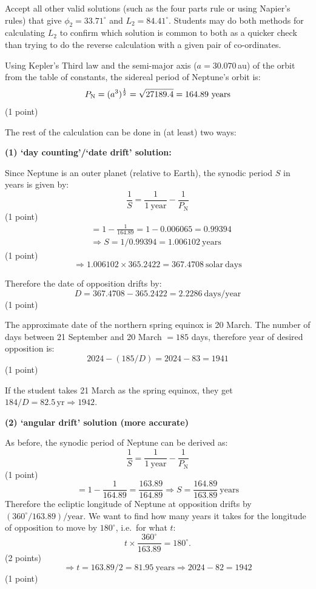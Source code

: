 Accept all other valid solutions (such as the four parts rule or using
Napier's rules) that give $\phi_2 = 33.71^\circ$ and $L_2 = 84.41^\circ$.
Students may do both methods for calculating $L_2$ to confirm which solution
is common to both as a quicker check than trying to do the reverse calculation
with a given pair of co-ordinates.

Using Kepler's Third law and the semi-major axis ($a = 30.070$\,au) of the
orbit from the table of constants, the sidereal period of Neptune's orbit is:
\[
  P_{\mathrm{N}} = (a^3)^{\frac{1}{2}} = \sqrt{27189.4}
    = 164.89\ \mathrm{years} \hfill
\]
\hfill(1 point)

The rest of the calculation can be done in (at least) two ways:

\medskip
\noindent\textbf{(1) `day counting'/`date drift' solution:}

Since Neptune is an outer planet (relative to Earth), the synodic period $S$ in
years is given by:
\[
  \frac{1}{S} = \frac{1}{1\ \mathrm{year}} - \frac{1}{P_{\mathrm{N}}}
\]
\hfill(1 point)
\begin{align*}
  &= 1 - \frac{1}{164.89} = 1 - 0.006065 = 0.99394\\
  &\Longrightarrow S = 1/0.99394 = 1.006102\ \mathrm{years}
\end{align*}
\hfill(1 point)
\[
  \Longrightarrow 1.006102 \times 365.2422 = 367.4708\ \mathrm{solar\ days}
\]

Therefore the date of opposition drifts by:
\[
  D = 367.4708 - 365.2422 = 2.2286\ \mathrm{days/year}
\]
\hfill(1 point)

The approximate date of the northern spring equinox is 20 March. The number of
days between 21 September and 20 March $= 185$ days, therefore year of desired
opposition is:
\[
  2024 - (185/D) = 2024 - 83 = 1941
\]
\hfill(1 point)

If the student takes 21 March as the spring equinox, they get
$184/D = 82.5\,\mathrm{yr} \Longrightarrow 1942$.

\medskip
\noindent\textbf{(2) `angular drift' solution (more accurate)}

As before, the synodic period of Neptune can be derived as:
\[
  \frac{1}{S} = \frac{1}{1\ \mathrm{year}} - \frac{1}{P_{\mathrm{N}}}
\]
\hfill(1 point)
\[
  = 1 - \frac{1}{164.89} = \frac{163.89}{164.89}
  \Longrightarrow S = \frac{164.89}{163.89}\ \mathrm{years}
\]
Therefore the ecliptic longitude of Neptune at opposition drifts by
$(360^\circ/163.89)/\mathrm{year}$. We want to find how many years it takes for
the longitude of opposition to move by $180^\circ$, i.e.\ for what $t$:
\[
  t \times \frac{360^\circ}{163.89} = 180^\circ.
\]
\hfill(2 points)
\[
  \Longrightarrow t = 163.89/2 = 81.95\ \mathrm{years}
  \Longrightarrow 2024 - 82 = 1942
\]
\hfill(1 point)

